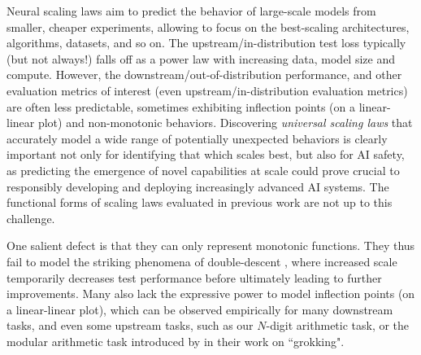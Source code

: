\documentclass{article} %
\begin{document}
Neural scaling laws \citep{cortes1994learning,2017arXiv171200409H,DBLP:journals/corr/abs-1909-12673,icm2020arXiv200108361K,DBLP:journals/corr/abs-2106-04560,abnar2021exploring,Alabdulmohsi2022revisiting, brown2020language} aim to predict the behavior of large-scale models from smaller, cheaper experiments, allowing to focus on the best-scaling architectures, algorithms, datasets, and so on. The upstream/in-distribution test loss typically (but not always!) falls off  as a power law with increasing  data, model size and compute. However, the downstream/out-of-distribution performance, and other evaluation metrics of interest (even upstream/in-distribution evaluation metrics) %
are often less predictable, sometimes exhibiting inflection points (on a linear-linear plot) and non-monotonic behaviors. Discovering {\it universal  scaling laws} that accurately model a wide range of potentially unexpected behaviors is clearly important not only for identifying that which scales best, but also for AI safety, as predicting the emergence of novel capabilities at scale could prove crucial to responsibly developing and deploying increasingly advanced AI systems. %
The functional forms of scaling laws evaluated in previous work are not up to this challenge.





One salient defect is that they can only represent monotonic functions.
They thus fail to model the striking phenomena of double-descent \citep{nakkiran2021deep}, where increased scale temporarily decreases test performance before ultimately leading to further improvements. %
Many also lack the expressive power to model inflection points (on a linear-linear plot), which can be observed empirically for many downstream tasks, and even some upstream tasks, such as our $N$-digit arithmetic task, or the modular arithmetic task introduced by \citet{power2022grokking} in their work on ``grokking".
\end{document}
